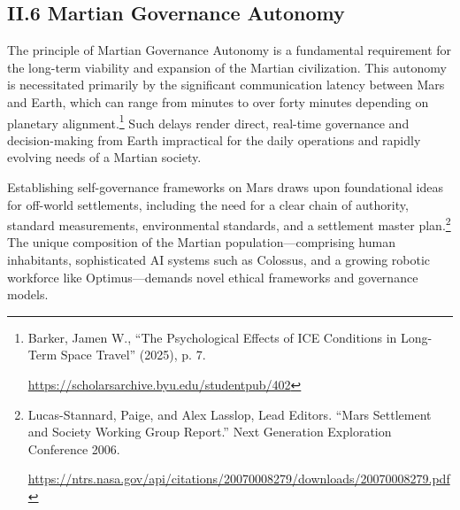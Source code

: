 \documentclass[fontsize=10pt, oneside, DIV=calc]{scrartcl}
\begin{document}
\subsection*{II.6 Martian Governance Autonomy}



The principle of Martian Governance Autonomy is a fundamental requirement for the long-term viability and expansion of the Martian civilization. This autonomy is necessitated primarily by the significant communication latency between Mars and Earth, which can range from minutes to over forty minutes depending on planetary alignment.\footnote{Barker, Jamen W., ``The Psychological Effects of ICE Conditions in Long-Term Space Travel'' (2025), p. 7. 







\href{https://scholarsarchive.byu.edu/studentpub/402}\url{https://scholarsarchive.byu.edu/studentpub/402}} Such delays render direct, real-time governance and decision-making from Earth impractical for the daily operations and rapidly evolving needs of a Martian society.

\medskip

\noindent
Establishing self-governance frameworks on Mars draws upon foundational ideas for off-world settlements, including the need for a clear chain of authority, standard measurements, environmental standards, and a settlement master plan.\footnote{Lucas-Stannard, Paige, and Alex Lasslop, Lead Editors. ``Mars Settlement and Society Working Group Report.'' Next Generation Exploration Conference 2006. 







\href{https://ntrs.nasa.gov/api/citations/20070008279/downloads/20070008279.pdf}\url{https://ntrs.nasa.gov/api/citations/20070008279/downloads/20070008279.pdf}} The unique composition of the Martian population---comprising human inhabitants, sophisticated AI systems such as Colossus, and a growing robotic workforce like Optimus---demands novel ethical frameworks and governance models.

\medskip
\end{document}
